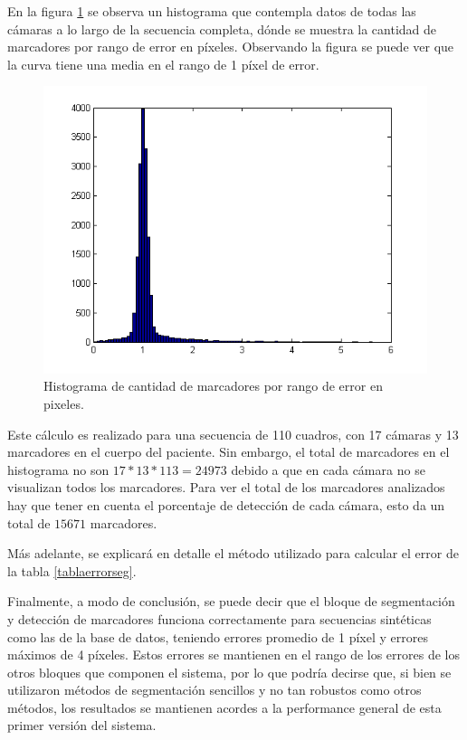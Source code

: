 En la figura \ref{histerr} se observa un histograma que contempla datos de todas las cámaras a lo largo de la secuencia completa, dónde se muestra la cantidad de marcadores por rango de error en píxeles. Observando la figura se puede ver que la curva tiene una media en el rango de 1 píxel de error.  

\begin{figure}[H]
\begin{center}
\includegraphics[scale=0.6]{img/Histo_Error.png}
\end{center}
\caption{Histograma de cantidad de marcadores por rango de error en pixeles.}
\label{histerr}
\end{figure}

Este cálculo es realizado para una secuencia de 110 cuadros, con 17 cámaras y 13 marcadores en el cuerpo del paciente. Sin embargo, el total de marcadores en el histograma no son $17*13*113 = 24973$ debido a que en cada cámara no se visualizan todos los marcadores. Para ver el total de los marcadores analizados hay que tener en cuenta el porcentaje de detección de cada cámara, esto da un total de $15671$ marcadores.

 Más adelante, se explicará en detalle el método utilizado para calcular el error de la tabla \ref{tablaerrorseg}.

Finalmente, a modo de conclusión, se puede decir que el bloque de segmentación y detección de marcadores funciona correctamente para secuencias sintéticas como las de la base de datos, teniendo errores promedio de 1 píxel y errores máximos de 4 píxeles. Estos errores se mantienen en el rango de los errores de los otros bloques que componen el sistema, por lo que podría decirse que, si bien se utilizaron métodos de segmentación sencillos y no tan robustos como otros métodos, los resultados se mantienen acordes a la performance general de esta primer versión del sistema.

